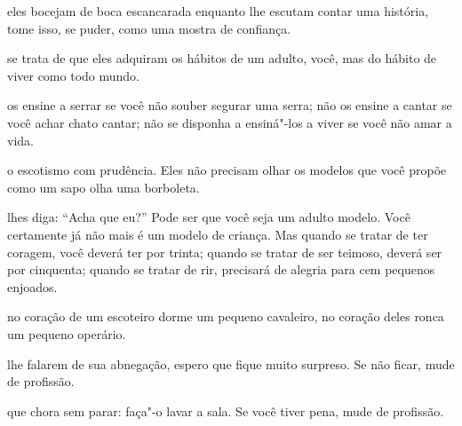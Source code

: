 \bigskip
\bigskip

 eles bocejam de boca escancarada enquanto lhe escutam contar uma
história, tome isso, se puder, como uma mostra de confiança.

\bigskip
\bigskip

 se trata de que eles adquiram os hábitos de um adulto, você, mas do
hábito de viver como todo mundo.

\bigskip
\bigskip

 os ensine a serrar se você não souber segurar uma serra; não os
ensine a cantar se você achar chato cantar; não se disponha a ensiná"-los
a viver se você não amar a vida.

\bigskip
\bigskip




 o escotismo com prudência. Eles não precisam olhar os modelos que
você propõe como um sapo olha uma borboleta.

\bigskip
\bigskip

 lhes diga: ``Acha que eu?'' Pode ser que você seja um adulto modelo.
Você certamente já não mais é um modelo de criança. Mas quando se tratar
de ter coragem, você deverá ter por trinta; quando se tratar de ser
teimoso, deverá ser por cinquenta; quando se tratar de rir, precisará de
alegria para cem pequenos enjoados.

\bigskip
\bigskip

 no coração de um escoteiro dorme um pequeno cavaleiro, no coração
deles ronca um pequeno operário.

\bigskip
\bigskip

 lhe falarem de sua abnegação, espero que fique muito surpreso. Se
não ficar, mude de profissão.

\bigskip
\bigskip

 que chora sem parar: faça"-o lavar a sala. Se você tiver pena,
mude de profissão.

\bigskip
\bigskip

\pagebreak
\thispagestyle{empty}

